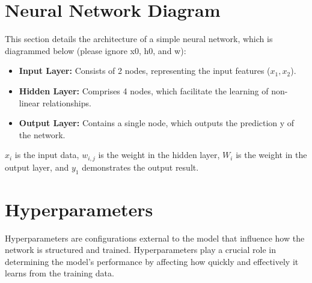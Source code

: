 \documentclass{article}
\begin{document}
\section{Neural Network Diagram}
This section details the architecture of a simple neural network, which is diagrammed below (please ignore x0, h0, and w):
\begin{itemize}
    \item \textbf{Input Layer:} Consists of 2 nodes, representing the input features ($x_1, x_2$).
    \item \textbf{Hidden Layer:} Comprises 4 nodes, which facilitate the learning of non-linear relationships.
    \item \textbf{Output Layer:} Contains a single node, which outputs the prediction y of the network.
\end{itemize}

\begin{center}
\end{center}
$x_i$ is the input data, $w_{i,j}$ is the weight in the hidden layer, $W_i$ is the weight in the output layer, and $y_1$ demonstrates the output result. 
\\

\section{Hyperparameters}
Hyperparameters are configurations external to the model that influence how the network is structured and trained. Hyperparameters play a crucial role in determining the model's performance by affecting how quickly and effectively it learns from the training data.
\end{document}
